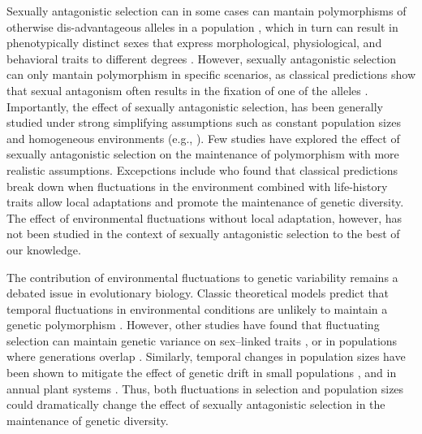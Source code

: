 \documentclass[12pt]{article}
\begin{document}
Sexually antagonistic selection can in some cases can mantain polymorphisms of otherwise dis-advantageous alleles in a population \citep{gavrilets2014sexual}, which in turn can result in phenotypically distinct sexes that express  morphological, physiological, and behavioral traits to different degrees \citep{mori2017sexual,connallon2018environmental}. However,  sexually antagonistic selection can only mantain polymorphism in specific scenarios, as classical predictions show that sexual antagonism often results in the fixation of one of the alleles \citep{curtsinger1994antagonistic,connallon_evolutionary_2018}. Importantly, the effect of sexually antagonistic selection, has been generally studied under strong simplifying assumptions such as constant population sizes and homogeneous environments (e.g., \citet{kidwell1977regions, pamilo1979genic, immler2012ploidally}). Few studies have explored the effect of sexually antagonistic selection on the maintenance of polymorphism with more realistic assumptions. Excepctions include \citet{connallon_evolutionary_2018} who found that classical predictions break down when fluctuations in the environment combined with life-history traits allow local adaptations and promote the maintenance of genetic diversity. The effect of environmental fluctuations without local adaptation, however, has not been studied in the context of sexually antagonistic selection to the best of our knowledge.


The contribution of environmental fluctuations to genetic variability remains a debated issue in evolutionary biology. Classic theoretical models predict that temporal fluctuations in environmental conditions are unlikely to maintain a genetic polymorphism \citep{hedrick1974genetic,hedrick1986genetic}. However, other studies have found that fluctuating selection can maintain genetic variance on sex--linked traits \citep{reinhold2000maintenance}, or in populations where generations overlap \citep{ellner1994role, ellner1996patterns}. Similarly, temporal changes in population sizes have been shown to mitigate the effect of genetic drift in small populations \citep{pemberton1996maintenance}, and in annual plant systems \citep{nunney2002effective}. Thus, both fluctuations in selection and population sizes could dramatically change the effect of sexually antagonistic selection in the maintenance of genetic diversity.
\end{document}
